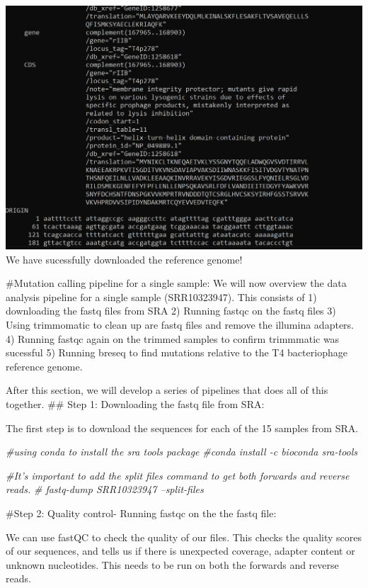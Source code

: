 \documentclass[
]{article}
\newenvironment{Shaded}{\begin{snugshade}}{\end{snugshade}}
\newcommand{\CommentTok}[1]{\textcolor[rgb]{0.56,0.35,0.01}{\textit{#1}}}
\begin{document}
\includegraphics{view_genebank_file.png} We have sucessfully downloaded
the reference genome!

\#Mutation calling pipeline for a single sample: We will now overview
the data analysis pipeline for a single sample (SRR10323947). This
consists of 1) downloading the fastq files from SRA 2) Running fastqc on
the fastq files 3) Using trimmomatic to clean up are fastq files and
remove the illumina adapters. 4) Running fastqc again on the trimmed
samples to confirm trimmmatic was sucessful 5) Running breseq to find
mutations relative to the T4 bacteriophage reference genome.

After this section, we will develop a series of pipelines that does all
of this together. \#\# Step 1: Downloading the fastq file from SRA:

The first step is to download the sequences for each of the 15 samples
from SRA.

\begin{Shaded}
\begin{Highlighting}[]
\CommentTok{#using conda to install the sra tools package}
\CommentTok{#conda install -c bioconda sra-tools}

\CommentTok{#It's important to add the split files command to get both forwards and reverse reads. }
\CommentTok{# fastq-dump SRR10323947 --split-files }
\end{Highlighting}
\end{Shaded}

\#Step 2: Quality control- Running fastqc on the the fastq file:

We can use fastQC to check the quality of our files. This checks the
quality scores of our sequences, and tells us if there is unexpected
coverage, adapter content or unknown nucleotides. This needs to be run
on both the forwards and reverse reads.
\end{document}
